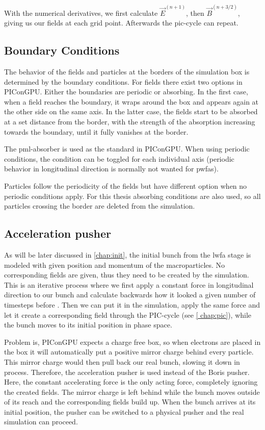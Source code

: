 \documentclass[bachelor_thesis]{subfiles}
\begin{document}
With the numerical derivatives, we first calculate $\vec{E}^{(n+1)}$, then $\vec{B}^{(n+3/2)}$, giving us our fields at each grid point. Afterwards the \gls{pic}-cycle can repeat.


\subsection{Boundary Conditions}
The behavior of the fields and particles at the borders of the simulation box is determined by the boundary conditions.
For fields there exist two options in PIConGPU. Either the boundaries are periodic or absorbing. In the first case, when a field reaches the boundary, it wraps around the box and appears again at the other side on the same axis.
In the latter case, the fields start to be absorbed at a set distance from the border, with the strength of the absorption increasing towards the boundary, until it fully vanishes at the border.

The \gls{pml}-absorber is used as the standard in PIConGPU. When using periodic conditions, the condition can be toggled for each individual axis (periodic behavior in longitudinal direction is normally not wanted for \gls{pwfa}s).

Particles follow the periodicity of the fields but have different option when no periodic conditions apply. For this thesis absorbing conditions are also used, so all particles crossing the border are deleted from the simulation.

\subsection{Acceleration pusher} \label{chap:accpush}
As will be later discussed in \autoref{chap:init}, the initial bunch from the \gls{lwfa} stage is modeled with given position and momentum of the macroparticles.
No corresponding fields are given, thus they need to be created by the simulation. This is an iterative process where we first apply a constant force in longitudinal direction to our bunch and calculate backwards how it looked a given number of timesteps before \cite{Huebl2014}.
Then we can put it in the simulation, apply the same force and let it create a corresponding field through the PIC-cycle (see \autoref{	chap:pic}), while the bunch moves to its initial position in phase space.

Problem is, PIConGPU expects a charge free box, so when electrons are placed in the box it will automatically put a positive mirror charge behind every particle. This mirror charge would then pull back our real 
bunch, slowing it down in process. Therefore, the acceleration pusher is used instead of the Boris pusher. Here, the constant accelerating force is the only acting force, completely ignoring the created fields.
The mirror charge is left behind while the bunch moves outside of its reach and the corresponding fields build up. When the bunch arrives at its initial position, the pusher can be switched to a physical pusher and
the real simulation can proceed.
\end{document}
